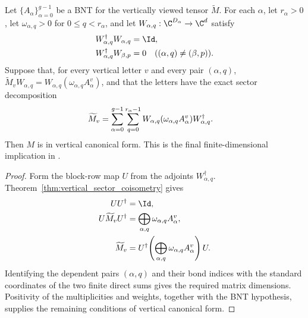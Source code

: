 \begin{theorem}
    \label{thm:vertical_cf_of_grouped_orthogonal_sectors}
    \leanok
    Let $\{A_\alpha\}_{\alpha=0}^{g-1}$ be a BNT for the vertically viewed
    tensor $\widetilde M$. For each $\alpha$, let $r_\alpha>0$, let
    $\omega_{\alpha,q}>0$ for $0\leq q<r_\alpha$, and let
    $W_{\alpha,q}:\C^{D_\alpha}\to\C^d$ satisfy
    \begin{align}
        W_{\alpha,q}^\dagger W_{\alpha,q}&=\Id,
        \notag\\
        W_{\alpha,q}^\dagger W_{\beta,p}&=0
        \quad((\alpha,q)\ne(\beta,p)).
        \notag
    \end{align}
    Suppose that, for every vertical letter $v$ and every pair $(\alpha,q)$,
    $\widetilde M_vW_{\alpha,q}
    =W_{\alpha,q}(\omega_{\alpha,q}A_\alpha^v)$, and that the letters have
    the exact sector decomposition
    \begin{align}
        \widetilde M_v
        &=\sum_{\alpha=0}^{g-1}\sum_{q=0}^{r_\alpha-1}
          W_{\alpha,q}(\omega_{\alpha,q}A_\alpha^v)
          W_{\alpha,q}^\dagger.
        \notag
    \end{align}
    Then $M$ is in vertical canonical form.
    This is the final finite-dimensional implication in
    \cite[Proposition~4.13, lines~1863--1870]{Cirac2016MPDO_arXiv}.
\end{theorem}

\begin{proof}
    \leanok
    Form the block-row map $U$ from the adjoints
    $W_{\alpha,q}^\dagger$. Theorem~\ref{thm:vertical_sector_coisometry}
    gives
    \begin{align}
        UU^\dagger&=\Id,
        \notag\\
        U\widetilde M_vU^\dagger
        &=\bigoplus_{\alpha,q}\omega_{\alpha,q}A_\alpha^v,
        \notag\\
        \widetilde M_v
        &=U^\dagger\!\left(\bigoplus_{\alpha,q}\omega_{\alpha,q}A_\alpha^v\right)U.
        \notag
    \end{align}
    Identifying the dependent pairs $(\alpha,q)$ and their bond indices with
    the standard coordinates of the two finite direct sums gives the required
    matrix dimensions. Positivity of the multiplicities and weights, together
    with the BNT hypothesis, supplies the remaining conditions of vertical
    canonical form.
\end{proof}

